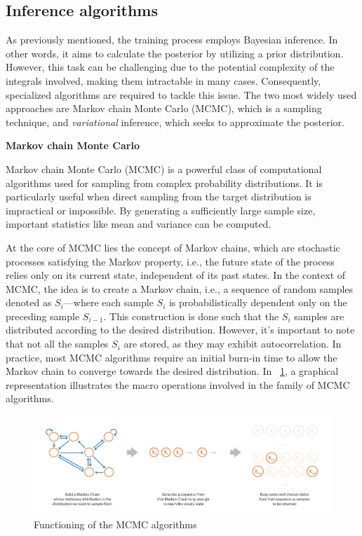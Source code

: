 \subsection{Inference algorithms}

As previously mentioned, the training process employs Bayesian inference. In other words, it aims to calculate the posterior by utilizing a prior distribution. However, this task can be challenging due to the potential complexity of the integrals involved, making them intractable in many cases. Consequently, specialized algorithms are required to tackle this issue. The two most widely used approaches are Markov chain Monte Carlo (MCMC), which is a sampling technique, and \textit{variational} inference, which seeks to approximate the posterior.

\vspace{0.2cm}
\textbf{Markov chain Monte Carlo}

Markov chain Monte Carlo (MCMC) is a powerful class of computational algorithms used for sampling from complex probability distributions. It is particularly useful when direct sampling from the target distribution is impractical or impossible. By generating a sufficiently large sample size, important statistics like mean and variance can be computed.

At the core of MCMC lies the concept of Markov chains, which are stochastic processes satisfying the Markov property, i.e., the future state of the process relies only on its current state, independent of its past states. 
In the context of MCMC, the idea is to create a Markov chain, i.e., a sequence of random samples denoted as $S_i$—where each sample $S_i$ is probabilistically dependent only on the preceding sample $S_{i-1}$. 
This construction is done such that the $S_i$ samples are distributed according to the desired distribution. However, it's important to note that not all the samples $S_i$ are stored, as they may exhibit autocorrelation. In practice, most MCMC algorithms require an initial burn-in time to allow the Markov chain to converge towards the desired distribution.
In \Fig~\ref{fig:mcmc}, a graphical representation illustrates the macro operations involved in the family of MCMC algorithms.

\begin{figure}[h]
	\centering
	\includegraphics[width=0.85\linewidth]{ImageFiles/BayesianNeuralNetworks/mcmc}
	\caption{Functioning of the MCMC algorithms \cite{BIPMCMCV}}
	\label{fig:mcmc}
\end{figure}

